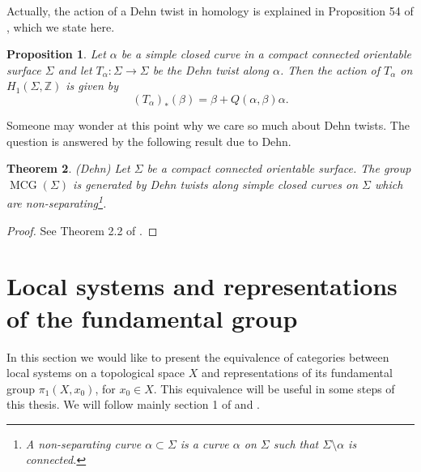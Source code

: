 \documentclass[a4paper,12 pt,titlepage,twoside]{book}
\newcommand{\numberset}{\mathbb}
\newcommand{\Z}{\numberset{Z}}
\DeclareMathOperator{\mcg}{MCG}
\theoremstyle{plain}
\newtheorem{thm}{Theorem}[section]
\theoremstyle{theorem}
\newtheorem{prop}[thm]{Proposition}
\theoremstyle{definition}
\theoremstyle{remark}
\begin{document}
	Actually, the action of a Dehn twist in homology is explained in Proposition 54 of \cite{MR2856237}, which we state here.
	\begin{prop}\label{prop: Dehn twist in homology}
		Let $\alpha$ be a simple closed curve in a compact connected orientable surface $\Sigma$ and let $T_\alpha \colon \Sigma \rightarrow \Sigma$ be the Dehn twist along $\alpha$. Then the action of $T_\alpha$ on $H_1(\Sigma,\Z)$ is given by $$(T_{\alpha})_* (\beta) = \beta + Q(\alpha, \beta) \alpha.$$
	\end{prop}
	Someone may wonder at this point why we care so much about Dehn twists. The question is answered by the following result due to Dehn.
	\begin{thm}(Dehn)
		Let $\Sigma$ be a compact connected orientable surface. The group $\mcg(\Sigma)$ is generated by Dehn twists along simple closed curves on $\Sigma$ which are non-separating\footnote{A \emph{non-separating} curve $\alpha \subset \Sigma$ is a curve $\alpha$ on $\Sigma$ such that $\Sigma \setminus \alpha$ is connected.}.
	\end{thm}
\begin{proof}
	See Theorem 2.2 of \cite{massuyea2009short}.
\end{proof}
\section{Local systems and representations of the fundamental group}
In this section we would like to present the equivalence of categories between local systems on a topological space $X$ and representations of its fundamental group $\pi_1(X,x_0)$, for $x_0 \in X$. This equivalence will be useful in some steps of this thesis. We will follow mainly section 1 of \cite{MR3025862} and \cite{achar_2007}.
\end{document}
